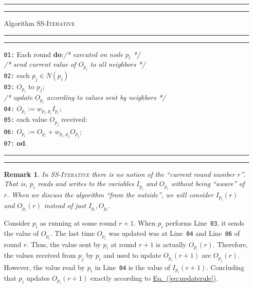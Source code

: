 \documentclass[preprint,12pt]{elsarticle}
\newtheorem{remark}{Remark}
\newcommand{\namedrefeq}[2]{\hyperref[#2]{#1~\mbox{\rm(\ref*{#2})}}}
\newcommand{\equationref}[1]{\namedrefeq{Eq.}{#1}}
\newcommand{\tb}{\makebox[0.4cm]{}}
\newcommand{\due}{\makebox[0.8cm]{}}
\newcommand\N{N}\newcommand\fl{f_{\!\ell}}
\newcommand{\syncAlg}{\textsc{SS-Iterative}\xspace}
\newcommand{\linenumber}[1]{{\tt #1}}
\newcommand{\lineref}[1]{Line~\linenumber{#1}}
\newcommand{\II}[2]{I_{#1}(#2)}
\newcommand{\OO}[2]{O_{#1}(#2)}
\begin{document}
\begin{figure*}[h]
\begin{center}
\begin{minipage}{4.8in}
\hrule \hrule \vspace{1.7mm} \footnotesize
\setlength{\baselineskip}{3.9mm} \noindent Algorithm \syncAlg
 \vspace{1mm} \hrule \hrule
\vspace{1mm}

\linenumber{01:} Each round {\bf do}:\hfill\textit{/* executed on
node $p_i$
*/}\\

\makebox[0.93cm]{} \textit{/* send current value of $O_{p_i}$ to all neighbors */}\\
\linenumber{02:} \tb {\bf for} each $p_j \in \N(p_i)$  \\
\linenumber{03:} \due {\bf send} $O_{p_i}$ to $p_j$; \\

\makebox[0.93cm]{} \textit{/* update $O_{p_i}$ according to values sent by neighbors */}\\
\linenumber{04:} \tb {\bf set} $O_{p_i} := w_{p_i,p_i} I_{p_i};$  \\
\linenumber{05:} \tb {\bf for} each value $O_{p_j}$ received:  \\
\linenumber{06:} \due {\bf update} $O_{p_i} := O_{p_i}  + w_{p_i,p_j} O_{p_j}$;\\

\linenumber{07:} {\bf od}.

\normalsize \vspace{1mm} \hrule\hrule
\end{minipage}
 \caption{A self-stabilizing iterative algorithm.}\label{figure:syncAlg}
 \end{center}
\end{figure*}

\begin{remark}
  In \syncAlg there is no notion of the ``current round number
  $r$''. That is, $p_i$ reads and writes to the variables $I_{p_i}$ and $O_{p_i}$
  without being ``aware'' of $r$. When we discuss the algorithm ``from the outside'', we will consider $\II{p_i}{r}$ and $\OO{p_i}{r}$ instead of
  just $I_{p_i}, O_{p_i}$.
\end{remark}

Consider $p_i$ as running at some round $r+1$. When $p_i$ performs
\lineref{03}, it sends the value of $O_{p_i}$. The last time
$O_{p_i}$ was updated was at \lineref{04} and \lineref{06} of
round $r$. Thus, the value sent by $p_i$ at round $r+1$ is
actually $\OO{p_i}{r}$. Therefore, the values received from $p_j$
by $p_i$ and used to update $\OO{p_i}{r+1}$ are $\OO{p_j}{r}$.
However, the value read by $p_i$ in \lineref{04} is the value of
$\II{p_i}{r+1}$. Concluding that $p_i$ updates $\OO{p_i}{r+1}$
exactly according to \equationref{eq:updaterule}.
\end{document}

